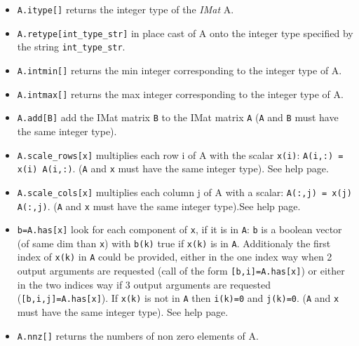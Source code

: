 \begin{itemize}
\item \verb+A.itype[]+ returns the integer type of the \emph{IMat} A.
\item \verb+A.retype[int_type_str]+ in place cast of A onto the integer type specified by the string \verb+int_type_str+.
\item \verb+A.intmin[]+ returns the min integer corresponding to the integer type of A.
\item \verb+A.intmax[]+ returns the max integer corresponding to the integer type of A.
\item \verb+A.add[B]+  add the IMat matrix \verb+B+ to the IMat matrix \verb+A+ (\verb+A+ and \verb+B+ must have
the same  integer type).
\item \verb+A.scale_rows[x]+ multiplies each row i of A with the scalar \verb+x(i)+:
  \verb+A(i,:) = x(i) A(i,:)+.  (\verb+A+ and \verb+x+ must have the same  integer type). See  help page.
\item \verb+A.scale_cols[x]+ multiplies each column j of A with a scalar:
  \verb+A(:,j) = x(j) A(:,j)+. (\verb+A+ and \verb+x+ must have the same  integer type).See  help page.
\item \verb+b=A.has[x]+ look for each component of \verb+x+, 
  if it is in \verb+A+: \verb+b+ is a boolean vector 
  (of same dim than \verb+x+) with \verb+b(k)+ true if
  \verb+x(k)+ is in \verb+A+. Additionaly the first index of
  \verb+x(k)+ in \verb+A+ could be provided, either in the one index way
  when 2 output arguments are requested (call of the form \verb+[b,i]=A.has[x]+) or
  either in the two indices way if 3 output arguments are requested
  (\verb+[b,i,j]=A.has[x]+). If \verb+x(k)+ is not in \verb+A+ then
  \verb+i(k)=0+ and \verb+j(k)=0+. (\verb+A+ and \verb+x+ must have the same  integer type). See
   help page.
\item \verb+A.nnz[]+ returns the numbers of non zero elements of A.
\end{itemize}

